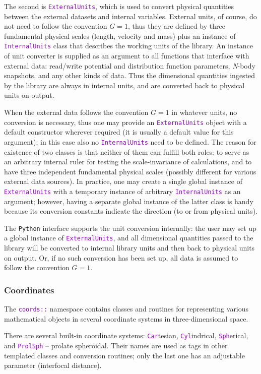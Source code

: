 \documentclass[12pt]{article}
\newcommand{\Nbody}{\textsl{N}-body\xspace}
\newcommand{\Python}{\texttt{Python}\xspace}
\newcommand{\ttt}[1]{\textcolor{darkviolet}{\texttt{#1}}}
\begin{document}
The second is \ttt{ExternalUnits}, which is used to convert physical quantities between the external datasets and internal variables. External units, of course, do not need to follow the convention $G=1$, thus they are defined by three fundamental physical scales (length, velocity and mass) plus an instance of \ttt{InternalUnits} class that describes the working units of the library. An instance of unit converter is supplied as an argument to all functions that interface with external data: read/write potential and distribution function parameters, \Nbody snapshots, and any other kinds of data. Thus the dimensional quantities ingested by the library are always in internal units, and are converted back to physical units on output.

When the external data follows the convention $G=1$ in whatever units, no conversion is necessary, thus one may provide an \ttt{ExternalUnits} object with a default constructor wherever required (it is usually a default value for this argument); in this case also no \ttt{InternalUnits} need to be defined. The reason for existence of two classes is that neither of them can fulfill both roles: to serve as an arbitrary internal ruler for testing the scale-invariance of calculations, and to have three independent fundamental physical scales (possibly different for various external data sources). In practice, one may create a single global instance of \ttt{ExternalUnits} with a temporary instance of arbitrary \ttt{InternalUnits} as an argument; however, having a separate global instance of the latter class is handy because its conversion constants indicate the direction (to or from physical units).

The \Python interface supports the unit conversion internally: the user may set up a global instance of \ttt{ExternalUnits}, and all dimensional quantities passed to the library will be converted to internal library units and then back to physical units on output. Or, if no such conversion has been set up, all data is assumed to follow the convention $G=1$.

\subsubsection{Coordinates}  \label{sec:Coords}
The \ttt{coords::} namespace contains classes and routines for representing various mathematical objects in several coordinate systems in three-dimensional space.

There are several built-in coordinate systems: \ttt{Car}tesian, \ttt{Cyl}indrical, \ttt{Sph}erical, and \ttt{ProlSph} -- prolate spheroidal. Their names are used as tags in other templated classes and conversion routines; only the last one has an adjustable parameter (interfocal distance).
\end{document}
